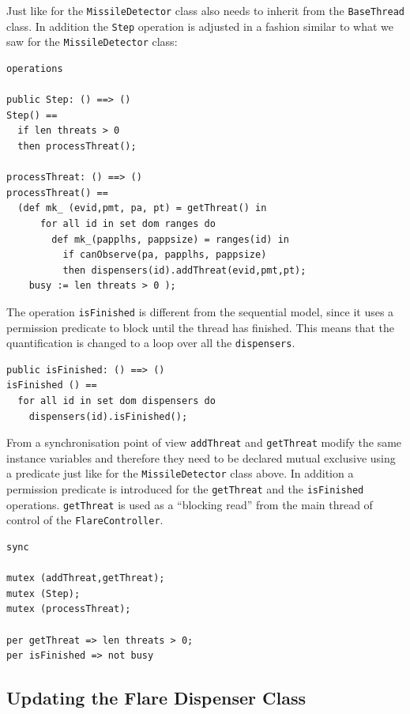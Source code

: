 \documentclass{overturerepchap}
\begin{document}
Just like for the \texttt{MissileDetector} class also needs to inherit
from the \texttt{BaseThread} class. In addition the \texttt{Step}
operation is adjusted in a fashion similar to what we saw for the
\texttt{Missile\-Detector} class:

\begin{lstlisting}
operations

public Step: () ==> ()
Step() ==
  if len threats > 0
  then processThreat();

processThreat: () ==> ()
processThreat() ==
  (def mk_ (evid,pmt, pa, pt) = getThreat() in
      for all id in set dom ranges do
        def mk_(papplhs, pappsize) = ranges(id) in
          if canObserve(pa, papplhs, pappsize)
          then dispensers(id).addThreat(evid,pmt,pt);
    busy := len threats > 0 );
\end{lstlisting}

The operation \texttt{isFinished} is different from the sequential
model, since it uses a permission predicate to block until the thread
has finished. This means that the {\bf{}} quantification is
changed to a loop over all the \texttt{dispensers}.

\begin{lstlisting}
public isFinished: () ==> ()
isFinished () ==
  for all id in set dom dispensers do
    dispensers(id).isFinished();
\end{lstlisting}

From a synchronisation point of view \texttt{addThreat} and 
\texttt{getThreat} modify the same instance variables and
therefore they need to be declared mutual exclusive using a
{\bf{}} 
predicate just like for the \texttt{MissileDetector} class above. 
In addition a permission predicate is introduced for the
\texttt{getThreat} and the \texttt{isFinished} operations. 
\texttt{getThreat} is used as a ``blocking read'' from the main
thread of control of the \texttt{FlareController}.

\begin{lstlisting}
sync

mutex (addThreat,getThreat);
mutex (Step);
mutex (processThreat);

per getThreat => len threats > 0;
per isFinished => not busy
\end{lstlisting}

\subsection{Updating the Flare Dispenser Class}
\end{document}
